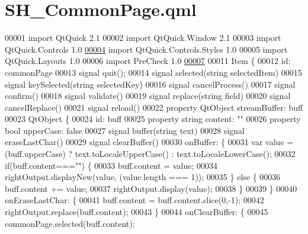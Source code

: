 \hypertarget{SH__CommonPage_8qml}{\section{S\-H\-\_\-\-Common\-Page.\-qml}
\label{SH__CommonPage_8qml}
}

\begin{DoxyCode}
00001 \textcolor{keyword}{import} QtQuick 2.1
00002 import QtQuick.Window 2.1
00003 import QtQuick.Controls 1.0
\hypertarget{SH__CommonPage_8qml_source_l00004}{}\hyperlink{classSH__CommonPage}{00004} import QtQuick.Controls.Styles 1.0
00005 import QtQuick.Layouts 1.0
00006 import PreCheck 1.0
\hypertarget{SH__CommonPage_8qml_source_l00007}{}\hyperlink{classSH__CommonPage_af59ae18e73706e3622c000c2005d9550}{00007} 
00011 Item \{
00012     \textcolor{keywordtype}{id}: commonPage
00013     signal quit();
00014     signal selected(\textcolor{keywordtype}{string} selectedItem)
00015     signal keySelected(\textcolor{keywordtype}{string} selectedKey)
00016     signal cancelProcess()
00017     signal confirm()
00018     signal validate()
00019     signal replace(\textcolor{keywordtype}{string} field)
00020     signal cancelReplace()
00021     signal reload()
00022     \textcolor{keyword}{property} QtObject streamBuffer: buff
00023     QtObject \{
00024         \textcolor{keywordtype}{id}: buff
00025         \textcolor{keyword}{property} \textcolor{keywordtype}{string} content: \textcolor{stringliteral}{""}
00026         \textcolor{keyword}{property} \textcolor{keywordtype}{bool} upperCase: \textcolor{keyword}{false}
00027         signal buffer(\textcolor{keywordtype}{string} text)
00028         signal eraseLastChar()
00029         signal clearBuffer()
00030         onBuffer: \{
00031             var value = (buff.upperCase) ? text.toLocaleUpperCase() : text.toLocaleLowerCase();
00032             \textcolor{keywordflow}{if}(buff.content===\textcolor{stringliteral}{""}) \{
00033                 buff.content = value;
00034                 rightOutput.displayNew(value, (value.length === 1));
00035             \} \textcolor{keywordflow}{else} \{
00036                 buff.content += value;
00037                 rightOutput.display(value);
00038             \}
00039         \}
00040         onEraseLastChar: \{
00041             buff.content = buff.content.slice(0,-1);
00042             rightOutput.replace(buff.content);
00043         \}
00044         onClearBuffer: \{
00045             commonPage.selected(buff.content);

\end{DoxyCode}
